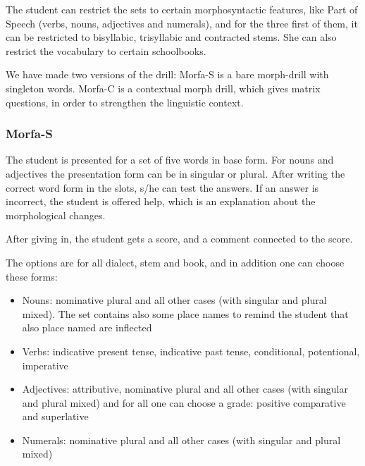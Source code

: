 \documentclass[a4paper,12pt]{article}
\begin{document}
The student can restrict the sets to certain morphosyntactic features, like Part of Speech (verbs, nouns, adjectives and numerals), and for the three first of them, it can be restricted to bisyllabic, trisyllabic and contracted stems. She can also restrict the vocabulary to certain schoolbooks.

We have made two versions of the drill: Morfa-S is a bare morph-drill with singleton words. Morfa-C is a contextual morph drill, which gives matrix questions, in order to strengthen the linguistic context.

\subsubsection{Morfa-S}
The student is presented for a set of five words in base form. For nouns and adjectives the presentation form can be in singular or plural. After writing the correct word form in the slots, s/he can test the answers. If an answer is incorrect, the student is offered help, which is an explanation about the morphological changes.

After giving in, the student gets a score, and a comment connected to the score.

The options are for all dialect, stem and book, and in addition one can choose these forms:
\begin{itemize}
\item Nouns: nominative plural and all other cases (with singular and plural mixed). The set contains also some place names to remind the student that also place named are inflected
\item Verbs: indicative present tense, indicative past tense, conditional, potentional, imperative
\item Adjectives: attributive, nominative plural and all other cases (with singular and plural mixed) and for all one can choose a grade: positive comparative and superlative
\item Numerals: nominative plural and all other cases (with singular and plural mixed)
\end{itemize}
\vspace{0.5cm}
\end{document}
